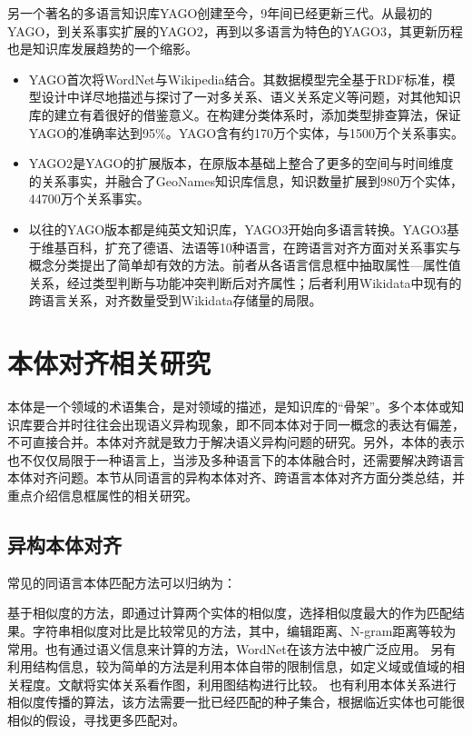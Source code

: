 另一个著名的多语言知识库YAGO创建至今，9年间已经更新三代。从最初的YAGO\cite{suchanek2007yago,suchanek2008yago}，到关系事实扩展的YAGO2\cite{hoffart2013yago2}，再到以多语言为特色的YAGO3\cite{mahdisoltani2014yago3}，其更新历程也是知识库发展趋势的一个缩影。
\begin{itemize}
  \item {\heiti YAGO}首次将WordNet\cite{fellbaum1998wordnet}与Wikipedia结合。其数据模型完全基于RDF标准，模型设计中详尽地描述与探讨了一对多关系、语义关系定义等问题，对其他知识库的建立有着很好的借鉴意义。在构建分类体系时，添加类型排查算法，保证YAGO的准确率达到95\%。YAGO含有约170万个实体，与1500万个关系事实。
  \item {\heiti YAGO2}是YAGO的扩展版本，在原版本基础上整合了更多的空间与时间维度的关系事实，并融合了GeoNames知识库信息，知识数量扩展到980万个实体，44700万个关系事实。
  \item 以往的YAGO版本都是纯英文知识库，{\heiti YAGO3}开始向多语言转换。YAGO3基于维基百科，扩充了德语、法语等10种语言，在跨语言对齐方面对关系事实与概念分类提出了简单却有效的方法。前者从各语言信息框中抽取属性—属性值关系，经过类型判断与功能冲突判断后对齐属性；后者利用Wikidata中现有的跨语言关系，对齐数量受到Wikidata存储量的局限。
\end{itemize}

\section{本体对齐相关研究}
\label{sec:ontology-research}

本体是一个领域的术语集合，是对领域的描述，是知识库的“骨架”。多个本体或知识库要合并时往往会出现{\heiti 语义异构}现象，即不同本体对于同一概念的表达有偏差，不可直接合并。本体对齐就是致力于解决语义异构问题的研究。另外，本体的表示也不仅仅局限于一种语言上，当涉及多种语言下的本体融合时，还需要解决跨语言本体对齐问题。本节从同语言的异构本体对齐、跨语言本体对齐方面分类总结，并重点介绍信息框属性的相关研究。

\subsection{异构本体对齐}
常见的同语言本体匹配方法可以归纳为：

{\heiti 基于相似度的方法}，即通过计算两个实体的相似度，选择相似度最大的作为匹配结果。字符串相似度对比是比较常见的方法，其中，编辑距离、N-gram距离等较为常用。也有通过语义信息来计算的方法，WordNet\cite{miller1995wordnet}在该方法中被广泛应用。 
另有利用结构信息，较为简单的方法是利用本体自带的限制信息，如定义域或值域的相关程度。文献\cite{hu2008matching}将实体关系看作图，利用图结构进行比较。
也有利用本体关系进行相似度传播的算法，该方法需要一批已经匹配的种子集合，根据临近实体也可能很相似的假设，寻找更多匹配对。

